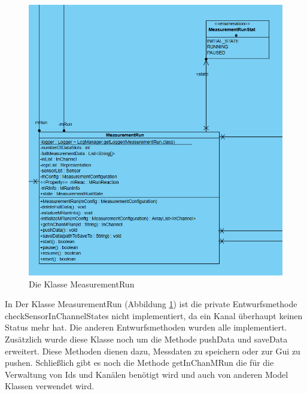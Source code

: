 \documentclass[parskip=full]{scrartcl}
\begin{document}
\begin{figure}[htbp]
	\begin{center}
		\includegraphics[width = 14cm]{Grafiken/mrun.PNG}
		\caption{Die Klasse MeasurementRun}
		\label{mrun}
	\end{center}
\end{figure}

In Der Klasse MeasurementRun (Abbildung \ref{mrun}) ist die private Entwurfsmethode checkSensorInChannelStates nicht implementiert, da ein Kanal überhaupt keinen Status mehr hat. Die anderen Entwurfsmethoden wurden alle implementiert. Zusätzlich wurde diese Klasse noch um die Methode pushData und saveData erweitert. Diese Methoden dienen dazu, Messdaten zu speichern oder zur Gui zu pushen. Schließlich gibt es noch die Methode getInChanMRun die für die Verwaltung von Ids und Kanälen benötigt wird und auch von anderen Model Klassen verwendet wird.
\end{document}
